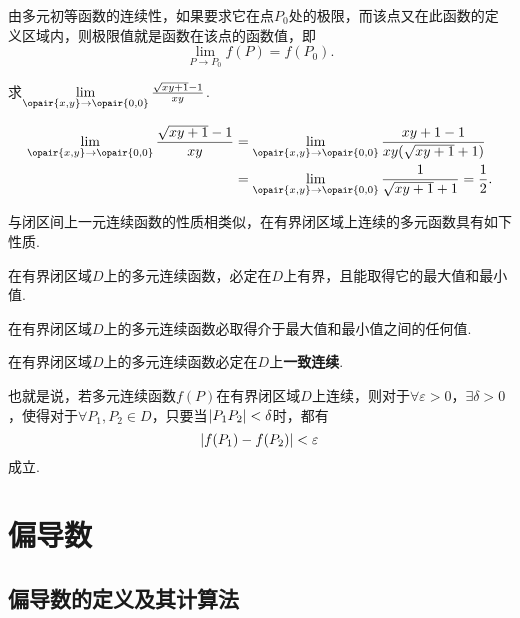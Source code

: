 由多元初等函数的连续性，如果要求它在点\(P_0\)处的极限，而该点又在此函数的定义区域内，则极限值就是函数在该点的函数值，即\[
\lim\limits_{P \to P_0} f(P) = f(P_0).
\]

\begin{example}
\def\l{\lim\limits_{\opair{x,y}\to\opair{0,0}}}
求\(\l \frac{\sqrt{xy+1}-1}{xy}\).
\begin{solution}
\[\begin{split}
\l \frac{\sqrt{xy+1}-1}{xy}
&= \l \frac{xy+1-1}{xy(\sqrt{xy+1}+1)} \\
&= \l \frac{1}{\sqrt{xy+1}+1}
= \frac{1}{2}.
\end{split}\]
\end{solution}
\end{example}

与闭区间上一元连续函数的性质相类似，在有界闭区域上连续的多元函数具有如下性质.

\begin{property}[有界性与最值定理]\label{theorem:多元函数微分法.有界性与最值定理}
在有界闭区域\(D\)上的多元连续函数，必定在\(D\)上有界，且能取得它的最大值和最小值.
\end{property}

\begin{property}[介值定理]\label{theorem:多元函数微分法.介值定理}
在有界闭区域\(D\)上的多元连续函数必取得介于最大值和最小值之间的任何值.
\end{property}

\begin{property}[一致连续性定理]\label{theorem:多元函数微分法.一致连续性定理}
在有界闭区域\(D\)上的多元连续函数必定在\(D\)上\textbf{一致连续}.

也就是说，若多元连续函数\(f(P)\)在有界闭区域\(D\)上连续，则对于\(\forall \varepsilon > 0\)，\(\exists \delta > 0\)，使得对于\(\forall P_1,P_2 \in D\)，只要当\(\abs{P_1P_2}<\delta\)时，都有\[
\abs{f(P_1)-f(P_2)} < \varepsilon
\]成立.
\end{property}

\section{偏导数}
\subsection{偏导数的定义及其计算法}
